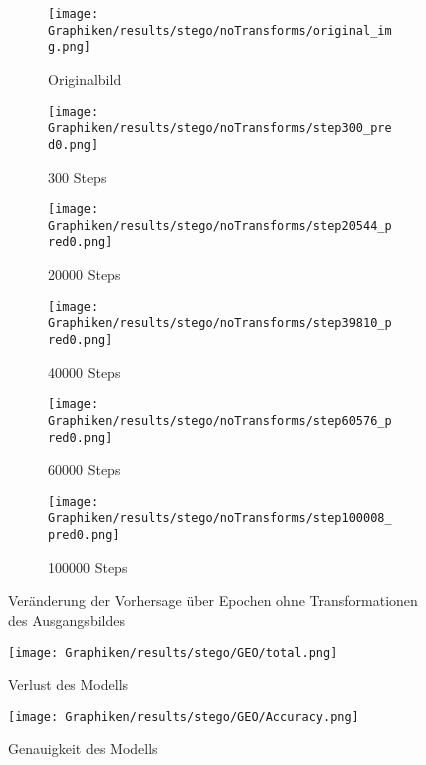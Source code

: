     \begin{figure}[h!]
        \begin{subfigure}[h]{0.3\linewidth}
            \texttt{[image: Graphiken/results/stego/noTransforms/original\_img.png]}
            \caption{ Originalbild}
        \end{subfigure}
        \hfill
        \begin{subfigure}[h]{0.3\linewidth}
            \texttt{[image: Graphiken/results/stego/noTransforms/step300\_pred0.png]}
            \caption{300 Steps}
        \end{subfigure}%
        \hfill
        \begin{subfigure}[h]{0.3\linewidth}
            \texttt{[image: Graphiken/results/stego/noTransforms/step20544\_pred0.png]}
            \caption{20000 Steps}
        \end{subfigure}%
        \hfill
        \begin{subfigure}[h]{0.3\linewidth}
            \texttt{[image: Graphiken/results/stego/noTransforms/step39810\_pred0.png]}
            \caption{40000 Steps}
        \end{subfigure}%
        \hfill
        \begin{subfigure}[h]{0.3\linewidth}
            \texttt{[image: Graphiken/results/stego/noTransforms/step60576\_pred0.png]}
            \caption{60000 Steps}
        \end{subfigure}%
        \hfill
        \begin{subfigure}[h]{0.3\linewidth}
            \texttt{[image: Graphiken/results/stego/noTransforms/step100008\_pred0.png]}
            \caption{100000 Steps}
        \end{subfigure}%
        \caption{Veränderung der Vorhersage über Epochen ohne Transformationen des Ausgangsbildes}
        \label{fig:stego_noTrans_iter}
    \end{figure} 
    
    \begin{figure}[h!]
        \centering
        \texttt{[image: Graphiken/results/stego/GEO/total.png]}
        \caption{Verlust des Modells}       
        \label{fig:stego_geo_loss}
    \end{figure}
    
    \begin{figure}[h!]
        \centering
        \texttt{[image: Graphiken/results/stego/GEO/Accuracy.png]}
        \caption{Genauigkeit des Modells}
        \label{fig:stego_geo_acc}
    \end{figure}
    
